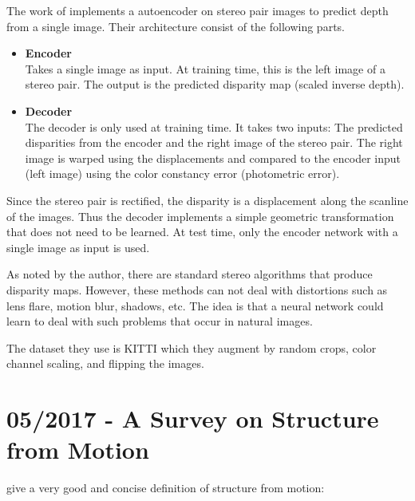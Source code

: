         The work of \cite{garg2016} implements a autoencoder on stereo pair images to predict depth from a single image.
        Their architecture consist of the following parts.
        \begin{itemize}
        	\item \textbf{Encoder}
        		\\
        		Takes a single image as input. 
        		At training time, this is the left image of a stereo pair.
        		The output is the predicted disparity map (scaled inverse depth).
        	\item \textbf{Decoder}
        		\\
        		The decoder is only used at training time.
        		It takes two inputs: The predicted disparities from the encoder and the right image of the stereo pair.
        		The right image is warped using the displacements and compared to the encoder input (left image) using the color constancy error (photometric error).
        \end{itemize}
        Since the stereo pair is rectified, the disparity is a displacement along the scanline of the images.
        Thus the decoder implements a simple geometric transformation that does not need to be learned.
        At test time, only the encoder network with a single image as input is used.
        
        As noted by the author, there are standard stereo algorithms that produce disparity maps.
        However, these methods can not deal with distortions such as lens flare, motion blur, shadows, etc.
        The idea is that a neural network could learn to deal with such problems that occur in natural images.
        
        The dataset they use is {KITTI} which they augment by random crops, color channel scaling, and flipping the images.
        
        \section{05/2017 - A Survey on Structure from Motion}
        
        	\cite{survey2017} give a very good and concise definition of structure from motion:
        	
        	
